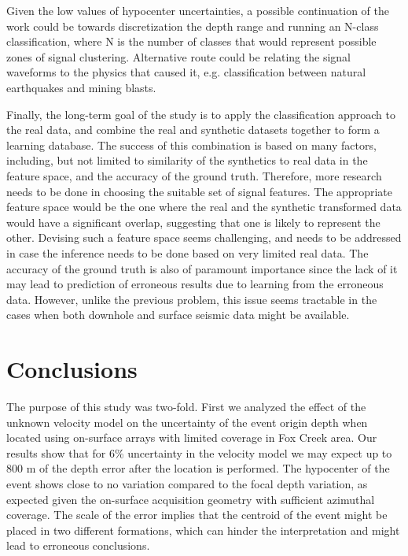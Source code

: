 Given the low values of hypocenter uncertainties, a possible continuation of the work could be towards discretization the depth range and running an N-class classification, where N is the number of classes that would represent possible zones of signal clustering. Alternative route could be relating the signal waveforms to the physics that caused it, e.g. classification between natural earthquakes and mining blasts.


Finally, the long-term goal of the study is to apply the classification approach to the real data, and combine the real and synthetic datasets together to form a learning database. The success of this combination is based on many factors, including, but not limited to similarity of the synthetics to real data in the feature space, and the accuracy of the ground truth. Therefore, more research needs to be done in choosing the suitable set of signal features. The appropriate feature space would be the one where the real and the synthetic transformed data would have a significant overlap, suggesting that one is likely to represent the other. Devising such a feature space seems challenging, and needs to be addressed in case the inference needs to be done based on very limited real data. The accuracy of the ground truth is also of paramount importance since the lack of it may lead to prediction of erroneous results due to learning from the erroneous data. However, unlike the previous problem, this issue seems tractable in the cases when both downhole and surface seismic data might be available.





\section{Conclusions}
The purpose of this study was two-fold. First we analyzed the effect of the unknown velocity model on the uncertainty of the event origin depth when located using on-surface arrays with limited coverage in Fox Creek area. Our results show that for 6\% uncertainty in the velocity model we may expect up to 800 m of the depth error after the location is performed. The hypocenter of the event shows close to no variation compared to the focal depth variation, as expected given the on-surface acquisition geometry with sufficient azimuthal coverage. The scale of the error implies that the centroid of the event might be placed in two different formations, which can hinder the interpretation and might lead to erroneous conclusions.

